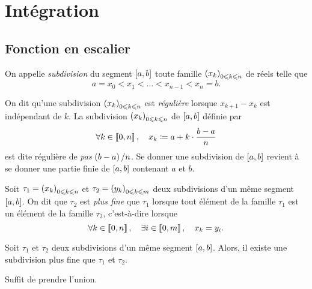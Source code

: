 \documentclass{magnolia}
\begin{document}
\magtoc

\section{Intégration}



\subsection{Fonction en escalier}


\begin{definition}[utile=-3]
On appelle \emph{subdivision} du segment $\left[a,b\right]$ toute famille
$\left(x_k\right)_{0\leqslant k\leqslant n}$ de réels telle que
\[a=x_0<x_1<\dots<x_{n-1}<x_n=b.\]
\end{definition}
\begin{remarques}
\remarque[utile=-3] On dit qu'une subdivision $\left(x_k\right)_{0\leqslant k\leqslant n}$ est \emph{régulière}
  lorsque $x_{k+1}-x_k$ est indépendant de $k$. La subdivision
  $\left(x_k\right)_{0\leqslant k\leqslant n}$ de $\left[a,b\right]$ définie par
  \[\forall k\in\left\llbracket 0,n\right\rrbracket ,\quad x_k\coloneqq a+k\cdot\frac{b-a}{n}\]
  est dite régulière de \emph{pas} $\left(b-a\right)/n$.
\remarque[utile=-1] Se donner une subdivision de $\left[a,b\right]$ revient à se donner
  une partie finie de $\left[a,b\right]$ contenant $a$ et $b$.
\end{remarques}


\begin{definition}[utile=-1]
Soit $\tau_1=\left(x_k\right)_{0\leqslant k\leqslant n}$ et $\tau_2=\left(y_k\right)_{0\leqslant k\leqslant m}$ deux
subdivisions d'un même segment $\left[a,b\right]$. On dit que $\tau_2$ est \emph{plus
fine} que $\tau_1$ lorsque tout élément de la famille $\tau_1$ est un élément de la
famille $\tau_2$, c'est-à-dire lorsque
\[\forall k\in\left\llbracket 0,n\right\rrbracket ,\quad \exists i\in\left\llbracket 0,m\right\rrbracket ,\quad
  x_k=y_i.\]
\end{definition}


\begin{proposition}[utile=-1]
Soit $\tau_1$ et $\tau_2$ deux subdivisions d'un même segment $\left[a,b\right]$.
Alors, il existe une subdivision plus fine que $\tau_1$ et $\tau_2$.
\end{proposition}

\begin{preuve}
Suffit de prendre l'union.
\end{preuve}
\end{document}
